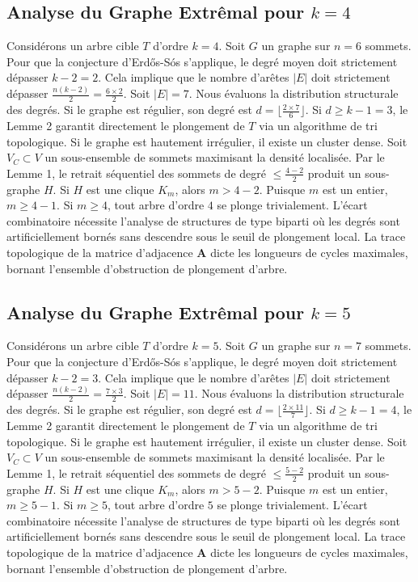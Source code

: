 \documentclass[11pt,a4paper]{article}
\begin{document}
\subsection{Analyse du Graphe Extr\^emal pour $k=4$}
Consid\'erons un arbre cible $T$ d'ordre $k=4$.
Soit $G$ un graphe sur $n=6$ sommets.
Pour que la conjecture d'Erd\H{o}s-S\'os s'applique, le degr\'e moyen doit strictement d\'epasser $k-2 = 2$.
Cela implique que le nombre d'ar\^etes $|E|$ doit strictement d\'epasser $\frac{n(k-2)}{2} = \frac{6 \times 2}{2}$.
Soit $|E| = 7$.
Nous \'evaluons la distribution structurale des degr\'es. Si le graphe est r\'egulier, son degr\'e est $d = \lfloor \frac{2 \times 7}{6} \rfloor$.
Si $d \geq k-1 = 3$, le Lemme 2 garantit directement le plongement de $T$ via un algorithme de tri topologique.
Si le graphe est hautement irr\'egulier, il existe un cluster dense. Soit $V_C \subset V$ un sous-ensemble de sommets maximisant la densit\'e localis\'ee.
Par le Lemme 1, le retrait s\'equentiel des sommets de degr\'e $\leq \frac{4-2}{2}$ produit un sous-graphe $H$.
Si $H$ est une clique $K_{m}$, alors $m > 4-2$. Puisque $m$ est un entier, $m \geq 4-1$. Si $m \geq 4$, tout arbre d'ordre $4$ se plonge trivialement.
L'\'ecart combinatoire n\'ecessite l'analyse de structures de type biparti o\`u les degr\'es sont artificiellement born\'es sans descendre sous le seuil de plongement local. La trace topologique de la matrice d'adjacence $\mathbf{A}$ dicte les longueurs de cycles maximales, bornant l'ensemble d'obstruction de plongement d'arbre.


\subsection{Analyse du Graphe Extr\^emal pour $k=5$}
Consid\'erons un arbre cible $T$ d'ordre $k=5$.
Soit $G$ un graphe sur $n=7$ sommets.
Pour que la conjecture d'Erd\H{o}s-S\'os s'applique, le degr\'e moyen doit strictement d\'epasser $k-2 = 3$.
Cela implique que le nombre d'ar\^etes $|E|$ doit strictement d\'epasser $\frac{n(k-2)}{2} = \frac{7 \times 3}{2}$.
Soit $|E| = 11$.
Nous \'evaluons la distribution structurale des degr\'es. Si le graphe est r\'egulier, son degr\'e est $d = \lfloor \frac{2 \times 11}{7} \rfloor$.
Si $d \geq k-1 = 4$, le Lemme 2 garantit directement le plongement de $T$ via un algorithme de tri topologique.
Si le graphe est hautement irr\'egulier, il existe un cluster dense. Soit $V_C \subset V$ un sous-ensemble de sommets maximisant la densit\'e localis\'ee.
Par le Lemme 1, le retrait s\'equentiel des sommets de degr\'e $\leq \frac{5-2}{2}$ produit un sous-graphe $H$.
Si $H$ est une clique $K_{m}$, alors $m > 5-2$. Puisque $m$ est un entier, $m \geq 5-1$. Si $m \geq 5$, tout arbre d'ordre $5$ se plonge trivialement.
L'\'ecart combinatoire n\'ecessite l'analyse de structures de type biparti o\`u les degr\'es sont artificiellement born\'es sans descendre sous le seuil de plongement local. La trace topologique de la matrice d'adjacence $\mathbf{A}$ dicte les longueurs de cycles maximales, bornant l'ensemble d'obstruction de plongement d'arbre.
\end{document}
